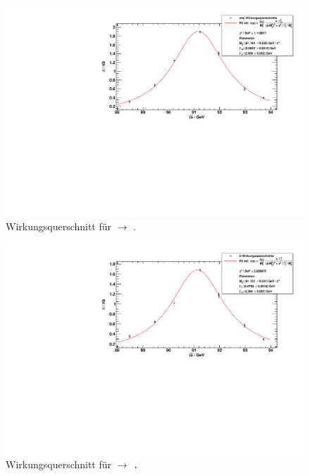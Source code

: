 \begin{figure}[H]
    \begin{center}
        \includegraphics[width=\textwidth]{../img/crosssections_mm.pdf}
        \caption{Wirkungsquerschnitt für \ee $\to$ \mm.}
        \label{img:crosssection:mm}
    \end{center}
\end{figure}

\begin{figure}[H]
    \begin{center}
        \includegraphics[width=\textwidth]{../img/crosssections_tt.pdf}
        \caption{Wirkungsquerschnitt für \ee $\to$ \tt.}
        \label{img:crosssection:tt}
    \end{center}
\end{figure}

